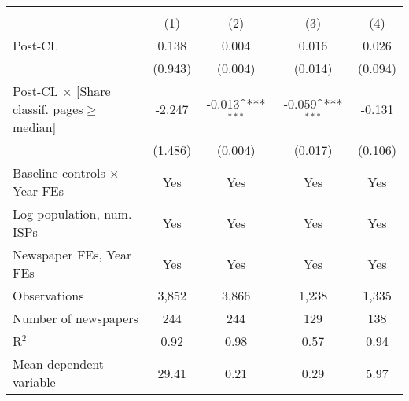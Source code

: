 {
\def\sym#1{\ifmmode^{#1}\else\(^{#1}\)\fi}
\begin{tabular}{l*{4}{c}}
\toprule
                    &&&&\\\cmidrule(lr){2-2}\cmidrule(lr){3-3}\cmidrule(lr){4-4}\cmidrule(lr){5-5}
                    &         &         &         &         \\
\midrule
Post-CL             &       0.138         &       0.004         &       0.016         &       0.026         \\
                    &     (0.943)         &     (0.004)         &     (0.014)         &     (0.094)         \\
\addlinespace
Post-CL $\times$ [Share classif. pages$\geq$ median]&      -2.247         &      -0.013\sym{***}&      -0.059\sym{***}&      -0.131         \\
                    &     (1.486)         &     (0.004)         &     (0.017)         &     (0.106)         \\
\addlinespace
Baseline controls $\times$ Year FEs &         Yes         &         Yes         &         Yes         &         Yes         \\
\addlinespace
Log population, num. ISPs &         Yes         &         Yes         &         Yes         &         Yes         \\
\addlinespace
Newspaper FEs, Year FEs &         Yes         &         Yes         &         Yes         &         Yes         \\
\midrule
Observations        &       3,852         &       3,866         &       1,238         &       1,335         \\
Number of newspapers&         244         &         244         &         129         &         138         \\
R$^2$               &        0.92         &        0.98         &        0.57         &        0.94         \\
Mean dependent variable&       29.41         &        0.21         &        0.29         &        5.97         \\
\bottomrule
\end{tabular}
}
